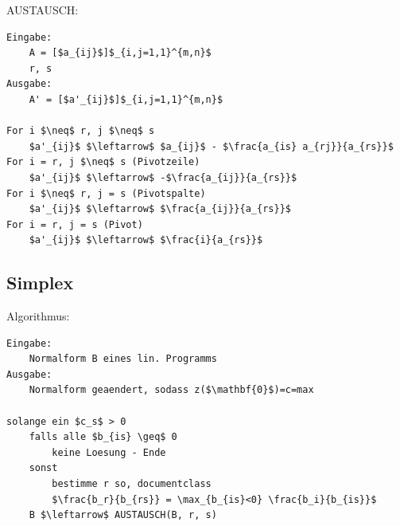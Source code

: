 \documentclass[8pt, DIV15, twocolumn]{scrartcl}
\begin{document}
AUSTAUSCH:

\begin{lstlisting}[mathescape=true]
Eingabe:
	A = [$a_{ij}$]$_{i,j=1,1}^{m,n}$
	r, s
Ausgabe:
	A' = [$a'_{ij}$]$_{i,j=1,1}^{m,n}$

For i $\neq$ r, j $\neq$ s
	$a'_{ij}$ $\leftarrow$ $a_{ij}$ - $\frac{a_{is} a_{rj}}{a_{rs}}$
For i = r, j $\neq$ s (Pivotzeile)
	$a'_{ij}$ $\leftarrow$ -$\frac{a_{ij}}{a_{rs}}$
For i $\neq$ r, j = s (Pivotspalte)
	$a'_{ij}$ $\leftarrow$ $\frac{a_{ij}}{a_{rs}}$
For i = r, j = s (Pivot)
	$a'_{ij}$ $\leftarrow$ $\frac{i}{a_{rs}}$
\end{lstlisting}

\subsection*{Simplex}
Algorithmus:

\begin{lstlisting}[mathescape=true]
Eingabe:
	Normalform B eines lin. Programms
Ausgabe:
	Normalform geaendert, sodass z($\mathbf{0}$)=c=max

solange ein $c_s$ > 0
	falls alle $b_{is} \geq$ 0
		keine Loesung - Ende
	sonst
		bestimme r so, documentclass
		$\frac{b_r}{b_{rs}} = \max_{b_{is}<0} \frac{b_i}{b_{is}}$
	B $\leftarrow$ AUSTAUSCH(B, r, s)
\end{lstlisting}
\end{document}

